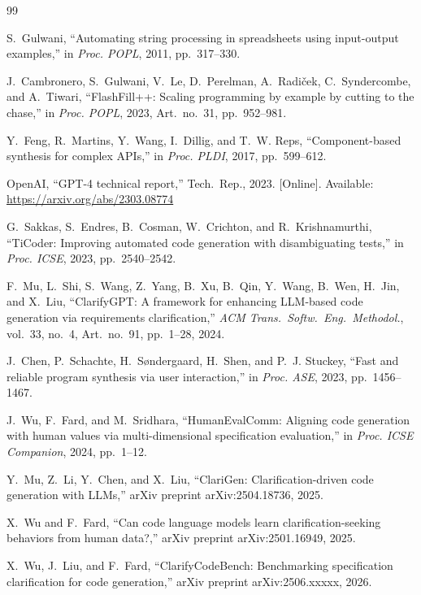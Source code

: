 \documentclass[10pt,conference]{IEEEtran}
\begin{document}
\begin{thebibliography}{99}

 S.~Gulwani, ``Automating string processing in spreadsheets using input-output examples,'' in \textit{Proc. POPL}, 2011, pp.~317--330.

 J.~Cambronero, S.~Gulwani, V.~Le, D.~Perelman, A.~Radiček, C.~Syndercombe, and A.~Tiwari, ``FlashFill++: Scaling programming by example by cutting to the chase,'' in \textit{Proc. POPL}, 2023, Art.~no.~31, pp.~952--981.

 Y.~Feng, R.~Martins, Y.~Wang, I.~Dillig, and T.~W. Reps, ``Component-based synthesis for complex APIs,'' in \textit{Proc. PLDI}, 2017, pp.~599--612.

 OpenAI, ``GPT-4 technical report,'' Tech.\ Rep., 2023. [Online]. Available: \url{https://arxiv.org/abs/2303.08774}

 G.~Sakkas, S.~Endres, B.~Cosman, W.~Crichton, and R.~Krishnamurthi, ``TiCoder: Improving automated code generation with disambiguating tests,'' in \textit{Proc. ICSE}, 2023, pp.~2540--2542. %

 F.~Mu, L.~Shi, S.~Wang, Z.~Yang, B.~Xu, B.~Qin, Y.~Wang, B.~Wen, H.~Jin, and X.~Liu, ``ClarifyGPT: A framework for enhancing LLM-based code generation via requirements clarification,'' \textit{ACM Trans.\ Softw.\ Eng.\ Methodol.}, vol.~33, no.~4, Art.~no.~91, pp.~1--28, 2024.

 J.~Chen, P.~Schachte, H.~Søndergaard, H.~Shen, and P.~J. Stuckey, ``Fast and reliable program synthesis via user interaction,'' in \textit{Proc. ASE}, 2023, pp.~1456--1467.

 J.~Wu, F.~Fard, and M.~Sridhara, ``HumanEvalComm: Aligning code generation with human values via multi-dimensional specification evaluation,'' in \textit{Proc. ICSE Companion}, 2024, pp.~1--12.

 Y.~Mu, Z.~Li, Y.~Chen, and X.~Liu, ``ClariGen: Clarification-driven code generation with LLMs,'' arXiv preprint arXiv:2504.18736, 2025.

 X.~Wu and F.~Fard, ``Can code language models learn clarification-seeking behaviors from human data?,'' arXiv preprint arXiv:2501.16949, 2025.

 X.~Wu, J.~Liu, and F.~Fard, ``ClarifyCodeBench: Benchmarking specification clarification for code generation,'' arXiv preprint arXiv:2506.xxxxx, 2026.


\end{thebibliography}
\end{document}

